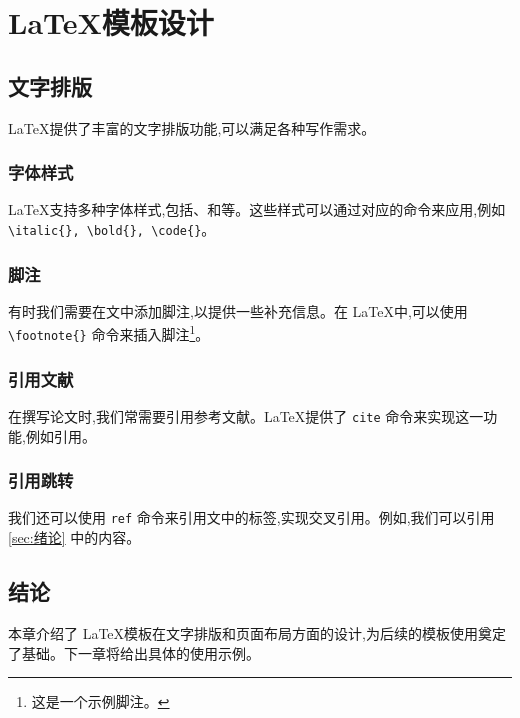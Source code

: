 \chapter{\LaTeX 模板设计}

\section{文字排版}
\LaTeX 提供了丰富的文字排版功能,可以满足各种写作需求。

\subsection{字体样式}
\LaTeX 支持多种字体样式\cite{lee_chapter_2022,brown_online_2023},包括、和等。这些样式可以通过对应的命令来应用,例如 \verb|\italic{}, \bold{}, \code{}|。

\subsection{脚注}
有时我们需要在文中添加脚注,以提供一些补充信息。在 \LaTeX 中,可以使用 \verb|\footnote{}| 命令来插入脚注\footnote{这是一个示例脚注。}。

\subsection{引用文献}
在撰写论文时,我们常需要引用参考文献。\LaTeX 提供了 \verb|cite| 命令来实现这一功能,例如引用\cite{johnson_modern_2021,kim_advanced_2019}。

\subsection{引用跳转}
我们还可以使用 \verb|ref| 命令来引用文中的标签,实现交叉引用。例如,我们可以引用 \autoref{sec:绪论} 中的内容。

\section{结论}
本章介绍了 \LaTeX 模板在文字排版和页面布局方面的设计,为后续的模板使用奠定了基础。下一章将给出具体的使用示例。
